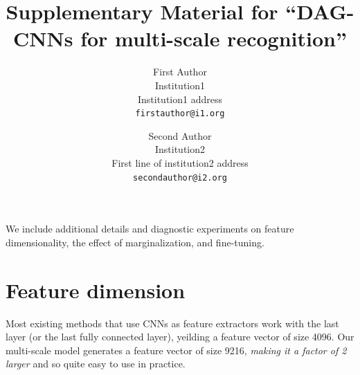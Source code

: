 \documentclass[10pt,twocolumn,letterpaper]{article}
\begin{document}
\title{Supplementary Material for ``DAG-CNNs for multi-scale recognition''}

\author{First Author\\
Institution1\\
Institution1 address\\
{\tt\small firstauthor@i1.org}
\and
Second Author\\
Institution2\\
First line of institution2 address\\
{\tt\small secondauthor@i2.org}
}

\maketitle

%

We include additional details and diagnostic experiments on feature dimensionality, the effect of marginalization, and fine-tuning.

\section{Feature dimension}
Most existing methods that use CNNs as feature extractors work with the last layer (or the last fully connected layer), yeilding a feature vector of size 4096. Our multi-scale model generates a feature vector of size 9216, {\em making it a factor of 2 larger} and so quite easy to use in practice.
\end{document}
